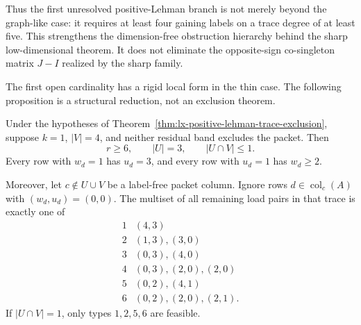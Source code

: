 Thus the first unresolved positive-Lehman branch is not merely beyond the
graph-like case: it requires at least four gaining labels on a trace degree of
at least five.  This strengthens the dimension-free obstruction hierarchy
behind the sharp low-dimensional theorem.  It does not eliminate the
opposite-sign co-singleton matrix $J-I$ realized by the sharp family.

The first open cardinality has a rigid local form in the thin case.  The
following proposition is a structural reduction, not an exclusion theorem.

\begin{proposition}
\label{prop:lx-thin-four-label-normal-form}
Under the hypotheses of
Theorem~\ref{thm:lx-positive-lehman-trace-exclusion}, suppose $k=1$,
$|V|=4$, and neither residual band excludes the packet.  Then
\[
 r\geq6,\qquad |U|=3,\qquad |U\cap V|\leq1.         \tag{LH-4a}
 \label{eq:lx-four-label-parameters}
\]
Every row with $w_d=1$ has $u_d=3$, and every row with $u_d=1$ has
$w_d\geq2$.

Moreover, let $c\notin U\cup V$ be a label-free packet column.  Ignore rows
$d\in\operatorname{col}_c(A)$ with $(w_d,u_d)=(0,0)$.  The multiset of all
remaining load pairs in that trace is exactly one of
\[
\begin{array}{c|l}
 1&(4,3)\\
 2&(1,3),(3,0)\\
 3&(0,3),(4,0)\\
 4&(0,3),(2,0),(2,0)\\
 5&(0,2),(4,1)\\
 6&(0,2),(2,0),(2,1).
\end{array}                                         \tag{LH-4b}
\label{eq:lx-four-label-local-types}
\]
If $|U\cap V|=1$, only types $1,2,5,6$ are feasible.
\end{proposition}

